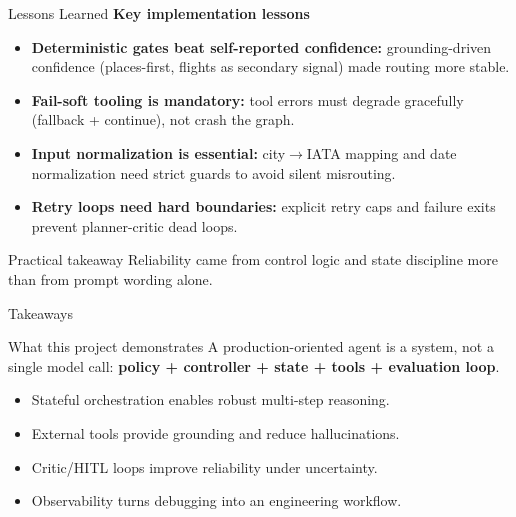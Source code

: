 \documentclass[9pt]{beamer}
\begin{document}
\begin{frame}{Lessons Learned}
\textbf{Key implementation lessons}
\begin{itemize}
    \item \textbf{Deterministic gates beat self-reported confidence:} grounding-driven confidence (places-first, flights as secondary signal) made routing more stable.
    \item \textbf{Fail-soft tooling is mandatory:} tool errors must degrade gracefully (fallback + continue), not crash the graph.
    \item \textbf{Input normalization is essential:} city\(\to\)IATA mapping and date normalization need strict guards to avoid silent misrouting.
    \item \textbf{Retry loops need hard boundaries:} explicit retry caps and failure exits prevent planner-critic dead loops.
\end{itemize}

\begin{block}{Practical takeaway}
Reliability came from control logic and state discipline more than from prompt wording alone.
\end{block}
\end{frame}

\begin{frame}{Takeaways}
\begin{block}{What this project demonstrates}
A production-oriented agent is a system, not a single model call:
\textbf{policy + controller + state + tools + evaluation loop}.
\end{block}

\begin{itemize}
    \item Stateful orchestration enables robust multi-step reasoning.
    \item External tools provide grounding and reduce hallucinations.
    \item Critic/HITL loops improve reliability under uncertainty.
    \item Observability turns debugging into an engineering workflow.
\end{itemize}
\end{frame}
\end{document}
